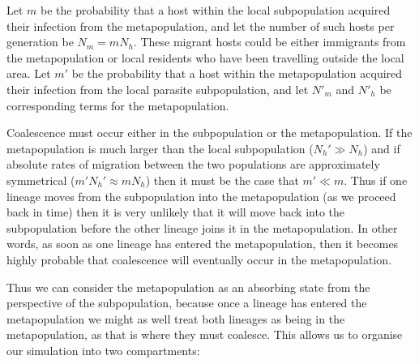 \documentclass[_main.tex]{subfiles}
\begin{document}
Let $m$ be the probability that a host within the local subpopulation acquired their infection from the metapopulation, and let the number of such hosts per generation be $N_m = m N_h$.  These migrant hosts could be either immigrants from the metapopulation or local residents who have been travelling outside the local area.  Let $m'$ be the probability that a host within the metapopulation acquired their infection from the local parasite subpopulation, and let $N'_m$ and $N'_h$ be corresponding terms for the metapopulation.  

Coalescence must occur either in the subpopulation or the metapopulation.  If the metapopulation is much larger than the local subpopulation ($N_h' \gg N_h$) and if absolute rates of migration between the two populations are approximately symmetrical ($m' N_h' \approx m N_h$) then it must be the case that $m' \ll m$.   Thus if one lineage moves from the subpopulation into the metapopulation (as we proceed back in time) then it is very unlikely that it will move back into the subpopulation before the other lineage joins it in the metapopulation.  In other words, as soon as one lineage has entered the metapopulation, then it becomes highly probable that coalescence will eventually occur in the metapopulation.  

Thus we can consider the metapopulation as an absorbing state from the perspective of the subpopulation, because once a lineage has entered the metapopulation we might as well treat both lineages as being in the metapopulation, as that is where they must coalesce. This allows us to organise our simulation into two compartments:   
\end{document}
